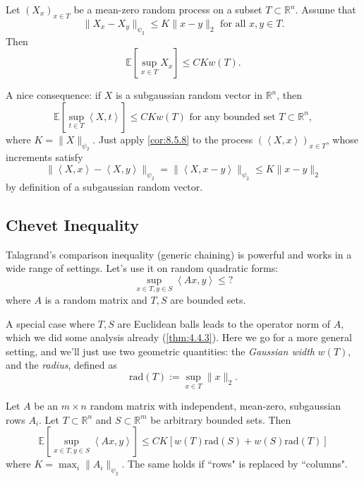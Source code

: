 \begin{corollary}
\label{cor:8.5.8}
Let $(X_x)_{x \in T}$ be a mean-zero random process on a subset $T \subset \mathbb{R}^n$. Assume that 
\[ \lVert X_x - X_y \rVert_{\psi_2} \leq K \lVert x - y \rVert_{2} \text{ for all } x, y \in T. \]
Then 
\[ \mathbb{E}\left[ \sup_{x \in T}X_x \right] \leq CK w(T). \]
\end{corollary}

\begin{remark}
\label{rmk:8.5.9}
A nice consequence: if $X$ is a subgaussian random vector in $\mathbb{R}^n$, then 
\[ \mathbb{E}\left[ \sup_{t \in T}\left\langle X, t \right\rangle \right] \leq CKw(T) 
\text{ for any bounded set } T \subset \mathbb{R}^n, \]
where $K = \lVert X \rVert_{\psi_2}$. Just apply \cref{cor:8.5.8} to the process $(\left\langle X, x 
\right\rangle )_{x \in T}$, whose increments satisfy 
\[ \lVert \left\langle X, x \right\rangle - \left\langle X, y \right\rangle \rVert_{\psi_2} 
= \lVert \left\langle X, x - y \right\rangle \rVert_{\psi_2} \leq K \lVert x - y \rVert_{2} \]
by definition of a subgaussian random vector.
\end{remark}



\subsection{Chevet Inequality}
Talagrand's comparison inequality (generic chaining) is powerful and works in a wide range of settings. Let's 
use it on random quadratic forms: 
\[ \sup_{x \in T, y \in S} \left\langle Ax, y \right\rangle \leq ? \]
where $A$ is a random matrix and $T, S$ are bounded sets.

A special case where $T, S$ are Euclidean balls leads to the operator norm of $A$, which we did some analysis 
already (\cref{thm:4.4.3}). Here we go for a more general setting, and we'll just use two geometric quantities: 
the \textit{Gaussian width} $w(T)$, and the \textit{radius}, defined as 
\[ \mathrm{rad}(T) := \sup_{x \in T}\lVert x \rVert_{2}. \]

\begin{theorem}
\label{thm:8.6.1}
Let $A$ be an $m \times n$ random matrix with independent, mean-zero, subgaussian rows $A_i$. Let $T \subset 
\mathbb{R}^n$ and $S \subset \mathbb{R}^m$ be arbitrary bounded sets. Then 
\[ \mathbb{E}\left[ \sup_{x \in T, y \in S} \left\langle Ax, y \right\rangle \right] \leq 
CK [w(T) \mathrm{rad}(S) + w(S) \mathrm{rad}(T)] \]
where $K = \max_{i} \lVert A_i \rVert_{\psi_2}$. The same holds if ``rows" is replaced by ``columns".
\end{theorem}

